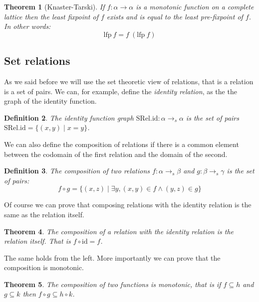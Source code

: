 \documentclass[
  a4paper, 
  10pt, 
  parskip=half, 
  DIV=20,
  toc=bibliography,
  usegeometry,
]{scrartcl}
\newtheorem{theorem}{Theorem}[section]
\newtheorem{definition}[theorem]{Definition}
\newcommand{\funfont}[1]{\text{#1}}
\begin{document}
\begin{theorem}[Knaster-Tarski]\label{thm:lfp_eq}
  If \(f: \alpha \to \alpha\) is a monotonic function on a complete lattice
  then the least fixpoint of \(f\) exists and is equal to the least
  pre-fixpoint of \(f\). In other words:
  \[
    \funfont{lfp} \ f = f \ (\funfont{lfp} \ f)
  \]
\end{theorem}

\subsection{Set relations}

As we said before we will use the set theoretic view of relations, that is
a relation is a set of pairs.
We can, for example, define the \emph{identity relation}, as the the graph of the identity
function.

\begin{definition}
  The identity function graph \(\funfont{SRel.id}: \alpha \to_s \alpha\) is the 
  set of pairs \(\funfont{SRel.id} = \{(x, y) \mid x = y\}\).
\end{definition}

We can also define the composition of relations if there is a common element
between the codomain of the first relation and the domain of the second.

\begin{definition}
  The composition of two relations \(f: \alpha \to_s \beta\) and \(g: \beta \to_s \gamma\)
  is the set of pairs:
  \[
    f \circ g = \{(x, z) \mid \exists y, (x, y) \in f \land (y, z) \in g\}
  \]
\end{definition}

Of course we can prove that composing relations with the identity relation
is the same as the relation itself.

\begin{theorem}
  The composition of a relation with the identity relation is the relation itself.
  That is \(f \circ \funfont{id} = f\).
\end{theorem}

The same holds from the left. More importantly we can prove that the composition
is monotonic.

\begin{theorem}
  The composition of two functions is monotonic, that is if \(f \subseteq h\) and
  \(g \subseteq k\) then \(f \circ g \subseteq h \circ k\).
\end{theorem}
\end{document}
